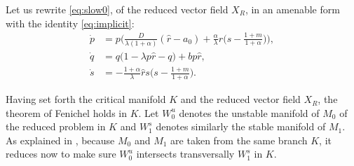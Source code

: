 \documentclass[a4paper,11pt]{article}
\theoremstyle{remark}
\begin{document}
Let us rewrite \eqref{eq:slow0}, of the reduced vector field $X_R$, in an amenable form with the identity \eqref{eq:implicit}:
\begin{equation}\label{eq:slow02}
 \begin{aligned}
 \dot{p} &= p\Big(\frac{D}{\lambda(1+\alpha)}(\hat{r}-a_0) + \frac{\alpha}{\lambda}\hat{r}\big(s- \frac{1+m}{1+\alpha}\big) \Big),\\
 \dot{q} &=q\Big(1 -\lambda p \hat{r} -q\Big) + b p \hat{r},\\%
 \dot{s} &= -\frac{1+\alpha}{\lambda}\hat{r}s\big(s- \frac{1+m}{1+\alpha}\big).
 \end{aligned}
\end{equation}

Having set forth the critical manifold $K$ and the reduced vector field $X_R$, the theorem of Fenichel holds in $K$. %
Let $W_0^u$ denotes the unstable manifold of $M_0$ of the reduced problem in $K$ and $W_1^s$ denotes similarly the stable manifold of $M_1$. As explained in \cite{Sz1991}, because $M_0$ and $M_1$ are taken from the same branch $K$, it reduces now to make sure $W_0^u$ intersects transversally $W_1^s$ in $K$.
\end{document}
